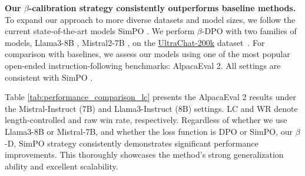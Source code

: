 \textbf{Our $\beta$-calibration strategy consistently outperforms baseline methods.} To expand our approach to more diverse datasets and model sizes, we follow the current state-of-the-art models SimPO \cite{SimPO2024}. We perform $\beta$-DPO with two families of models, Llama3-8B \citep{llama3modelcard}, Mistral2-7B \citep{Jiang2023Mistral7}, on the \href{https://huggingface.co/datasets/HuggingFaceH4/ultrachat_200k}{UltraChat-200k} dataset~\cite{Ding2023EnhancingCL}. For comparison with baselines, we assess our models using one of the most popular open-ended instruction-following benchmarks: AlpacaEval 2. All settings are consistent with SimPO \cite{SimPO2024}.
\begin{table}
\centering
\vspace{-0.6em}
\caption{Performance comparison of different models}
 \small
{}
\label{tab:performance_comparison_lc}
\end{table}
Table \ref{tab:performance_comparison_lc} presents the AlpacaEval 2 results under the Mistral-Instruct (7B) and Llama3-Instruct (8B) settings. LC and WR denote length-controlled and raw win rate, respectively. Regardless of whether we use Llama3-8B or Mistral-7B, and whether the loss function is DPO or SimPO, our $\beta$-{D, Sim}PO strategy consistently demonstrates significant performance improvements. This thoroughly showcases the method's strong generalization ability and excellent scalability.
